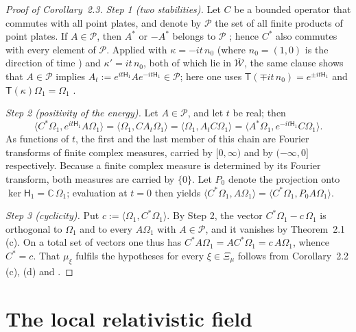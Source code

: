 \documentclass[11pt,letterpaper,reqno]{amsart}
\theoremstyle{definition}
\begin{document}
\begin{proof}[Proof of Corollary~2.3]
\emph{Step 1 (two stabilities).}
Let $C$ be a bounded operator that commutes with all point plates, and denote by $\mathcal P$ the set of all finite products of point plates.
If $A\in\mathcal P$, then $A^*$ or $-A^*$ belongs to $\mathcal P$ \cite[Proposition~14.18\,(b)]{QEDII}; hence $C^*$ also commutes with every element of $\mathcal P$.
Applied with $\kappa=-it\,n_0$ (where $n_0=(1,0)$ is the direction of time \cite[Definition~14.5]{QEDII}) and $\kappa'=it\,n_0$, both of which lie in $\overline{\mathcal W}$, the same clause shows that $A\in\mathcal P$ implies $A_t:=e^{it\mathsf H_1}Ae^{-it\mathsf H_1}\in\mathcal P$; here one uses $\mathsf T(\mp it\,n_0)=e^{\pm it\mathsf H_1}$ and $\mathsf T(\kappa)\Omega_1=\Omega_1$ \cite[Lemma~14.17\,(a)]{QEDII}.

\emph{Step 2 (positivity of the energy).}
Let $A\in\mathcal P$, and let $t$ be real; then
\begin{equation*}
\langle C^*\Omega_1,e^{it\mathsf H_1}A\Omega_1\rangle=\langle\Omega_1,CA_t\Omega_1\rangle=\langle\Omega_1,A_tC\Omega_1\rangle=\langle A^*\Omega_1,e^{-it\mathsf H_1}C\Omega_1\rangle.
\end{equation*}
As functions of $t$, the first and the last member of this chain are Fourier transforms of finite complex measures, carried by $[0,\infty)$ and by $(-\infty,0]$ respectively.
Because a finite complex measure is determined by its Fourier transform, both measures are carried by $\{0\}$.
Let $P_0$ denote the projection onto $\ker\mathsf H_1=\mathbb C\,\Omega_1$; evaluation at $t=0$ then yields $\langle C^*\Omega_1,\allowbreak A\Omega_1\rangle=\allowbreak \langle C^*\Omega_1,\allowbreak P_0A\Omega_1\rangle$.

\emph{Step 3 (cyclicity).}
Put $c:=\langle\Omega_1,C^*\Omega_1\rangle$.
By Step 2, the vector $C^*\Omega_1-c\,\Omega_1$ is orthogonal to $\Omega_1$ and to every $A\Omega_1$ with $A\in\mathcal P$, and it vanishes by Theorem~2.1\,(c).
On a total set of vectors one thus has $C^*A\Omega_1=AC^*\Omega_1=c\,A\Omega_1$, whence $C^*=c$.
That $\mu_\xi$ fulfils the hypotheses for every $\xi\in\Xi_\mu$ follows from Corollary~2.2\,(c), (d) and \cite[Theorem~44\,(D3)]{QEDIII}.
\end{proof}


\section{The local relativistic field}
\end{document}
